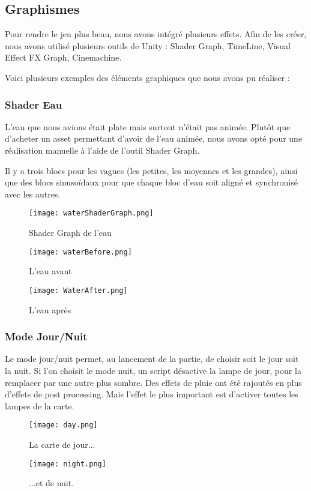 \subsection{Graphismes}

Pour rendre le jeu plus beau, nous avons intégré plusieurs effets.
Afin de les créer, nous avons utilisé plusieurs outils de Unity :
Shader Graph, TimeLine, Visual Effect FX Graph, Cinemachine.

Voici plusieurs exemples des éléments graphiques que nous avons pu réaliser : 


\subsubsection{Shader Eau}

L'eau que nous avions était plate mais surtout n'était pas animée.
Plutôt que d'acheter un asset permettant d'avoir de l'eau animée,
nous avons opté pour une réalisation manuelle à l'aide de l'outil Shader Graph.

Il y a trois blocs pour les vagues (les petites, les moyennes et les grandes),
ainsi que des blocs sinusoïdaux pour que chaque bloc d'eau soit aligné et synchronisé avec les autres.
\begin{figure}[hbt!]
    \centering
    \texttt{[image: waterShaderGraph.png]}
    \caption{Shader Graph de l'eau}
\end{figure}
\begin{figure}[hbt!]
    \centering
    \texttt{[image: waterBefore.png]}
    \caption{L'eau avant}
    \texttt{[image: WaterAfter.png]}
    \caption{L'eau après}
\end{figure}
\FloatBarrier



\subsubsection{Mode Jour/Nuit}
Le mode jour/nuit permet, au lancement de la partie,
de choisir soit le jour soit la nuit. Si l'on choisit le mode nuit, un script désactive la lampe de jour,
 pour la remplacer par une autre plus sombre. Des effets de pluie ont été rajoutés en plus d'effets de post processing.
Mais l'effet le plus important est d'activer toutes les lampes de la carte.
\begin{figure}[hbt!]
    \centering
    \texttt{[image: day.png]}
    \caption{La carte de jour...}

    \texttt{[image: night.png]}
    \caption{...et de nuit.}

\end{figure}


